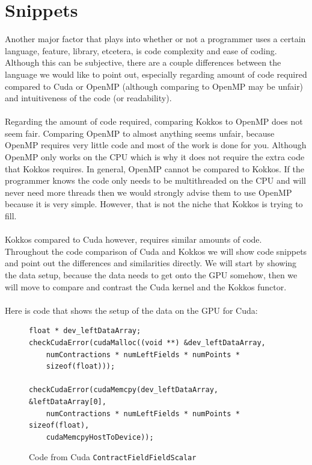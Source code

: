 \section{Snippets}
Another major factor that plays into whether or not a programmer uses a certain
language, feature, library, etcetera, is code complexity and ease of coding.
Although this can be subjective, there are a couple differences between the
language we would like to point out, especially regarding amount of code
required compared to Cuda or OpenMP (although comparing to OpenMP may be unfair)
and intuitiveness of the code (or readability). \\
\\
Regarding the amount of code required, comparing Kokkos to OpenMP does not seem
fair. Comparing OpenMP to almost anything seems unfair, because OpenMP requires
very little code and most of the work is done for you. Although OpenMP only
works on the CPU which is why it does not require the extra code that Kokkos
requires. In general, OpenMP cannot be compared to Kokkos. If the programmer
knows the code only needs to be multithreaded on the CPU and will never need
more threads then we would strongly advise them to use OpenMP because it is very
simple. However, that is not the niche that Kokkos is trying to fill. \\
\\
Kokkos compared to Cuda however, requires similar amounts of code. 
Throughout the code comparison of Cuda and Kokkos we will show
code snippets and point out the differences and similarities directly. We will
start by showing the data setup, because the data needs to get onto the GPU
somehow, then we will move to compare and contrast the Cuda kernel and the Kokkos
functor. \\
\\
Here is code that shows the setup of the data on the GPU for Cuda: \\
\begin{figure}[!htb]
	\begin{lstlisting}
float * dev_leftDataArray;
checkCudaError(cudaMalloc((void **) &dev_leftDataArray, 
	numContractions * numLeftFields * numPoints * 
	sizeof(float)));
	
checkCudaError(cudaMemcpy(dev_leftDataArray, &leftDataArray[0], 
	numContractions * numLeftFields * numPoints * sizeof(float), 
	cudaMemcpyHostToDevice));
	\end{lstlisting}
\caption{Code from Cuda \texttt{ContractFieldFieldScalar}
\label{lst:ContractFieldFieldScalar Cuda Data Setup}}
\end{figure}
